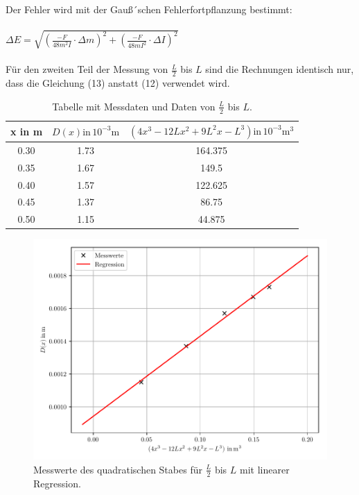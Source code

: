 Der Fehler wird mit der Gauß´schen Fehlerfortpflanzung bestimmt:\\\\

$\Delta E = \sqrt{\left(\frac{-F}{48m^2I}\cdot \Delta m \right)^2 + \left(
\frac{-F}{48mI^2} \cdot \Delta I \right)^2}$\\\\

Für den zweiten Teil der Messung von $\frac{L}{2}$ bis $L$ sind die Rechnungen
identisch nur, dass die Gleichung (13) anstatt (12) verwendet wird.

\begin{table}
  \centering
  \caption{Tabelle mit Messdaten und Daten von $\frac{L}{2}$ bis $L$.}
  \begin{tabular}{c c c}
    \toprule
    x in \si{\meter} & $D(x) \text{in} \, 10^{-3} \si{\meter}$ &
    $ \left( 4x^3-12Lx^2+9L^2x-L^3 \right) \text{in} \, 10^{-3} \si{\meter\tothe{3}}$\\
    \midrule
    0.30 & 1.73 & 164.375 \\
    0.35 & 1.67 & 149.5 \\
    0.40 & 1.57 & 122.625 \\
    0.45 & 1.37 & 86.75 \\
    0.50 & 1.15 & 44.875 \\
    \bottomrule
  \end{tabular}
\end{table}

\begin{figure}[H]
  \centering
  \includegraphics[width=\textwidth]{ausgleichsgerade3.1.pdf}
  \caption{Messwerte des quadratischen Stabes für $\frac{L}{2}$ bis $L$ mit linearer Regression.}
\end{figure}

